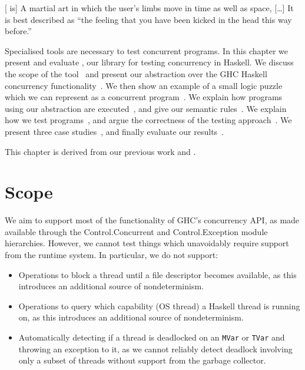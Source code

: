 \begin{displayquote}
  {[}\dejafu{} is] A martial art in which the user's limbs move in
  time as well as space, [\ldots] It is best described as ``the
  feeling that you have been kicked in the head this way
  before.''\cite{pratchett2001}
\end{displayquote}

\noindent
Specialised tools are necessary to test concurrent programs.  In this
chapter we present and evaluate \dejafu{}, our library for testing
concurrency in Haskell.  We discuss the scope of the
tool~ and present our abstraction over the GHC
Haskell concurrency functionality~.  We then
show an example of a small logic puzzle which we can represent as a
concurrent program~.  We explain how programs using
our abstraction are executed~, and give our
semantic rules~.  We explain how we test
programs~, and argue the correctness of the
testing approach~.  We present three case
studies~, and finally evaluate our
results~.

This chapter is derived from our previous work \cite{YCS-2016-503} and
\cite{walker2015}.

\section{Scope}
\label{sec:dejafu-scope}

We aim to support most of the functionality of GHC’s concurrency API,
as made available through the
Control.Concurrent\cite{control_concurrent} and
Control.Exception\cite{control_exception} module hierarchies.
However, we cannot test things which unavoidably require support from
the runtime system.  In particular, we do not support:

\begin{itemize}
\item Operations to block a thread until a file descriptor becomes
  available, as this introduces an additional source of
  nondeterminism.
\item Operations to query which capability (OS thread) a Haskell
  thread is running on, as this introduces an additional source of
  nondeterminism.
\item Automatically detecting if a thread is deadlocked on an
  \verb|MVar| or \verb|TVar| and throwing an exception to it, as we
  cannot reliably detect deadlock involving only a subset of threads
  without support from the garbage collector.
\end{itemize}

